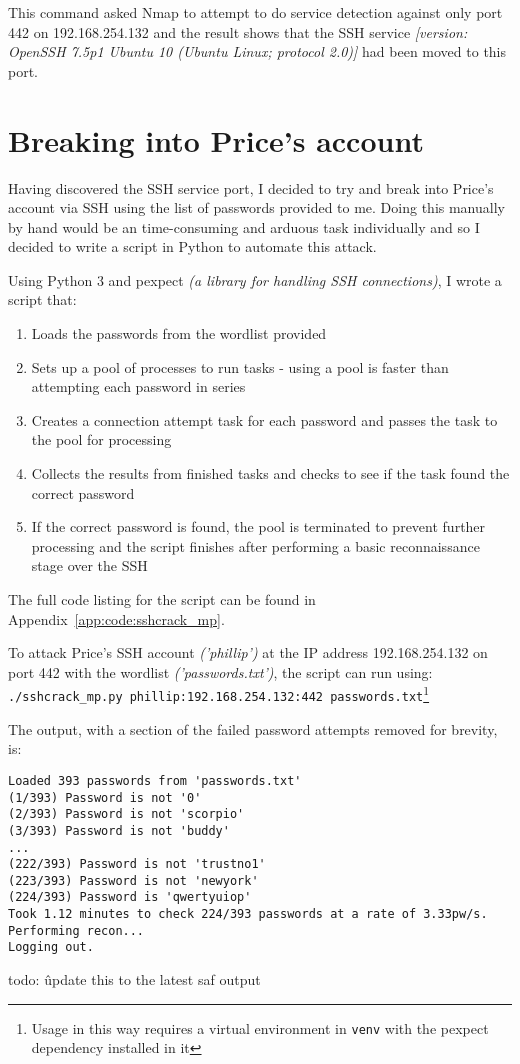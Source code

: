 \documentclass[12pt]{report}
\newcommand{\term}[1]{\colorbox{light-gray}{\texttt{#1}}}
\begin{document}
This command asked Nmap to attempt to do service detection against only port 442 on 192.168.254.132 and the result shows that the SSH service \textit{[version: OpenSSH 7.5p1 Ubuntu 10 (Ubuntu Linux; protocol 2.0)]} had been moved to this port.


\section{Breaking into Price's account}
Having discovered the SSH service port, I decided to try and break into Price's account via SSH using the list of passwords provided to me. Doing this manually by hand would be an time-consuming and arduous task individually and so I decided to write a script in Python to automate this attack.

Using Python 3 and pexpect \textit{(a library for handling SSH connections)}, I wrote a script that:
\begin{enumerate}
  \item Loads the passwords from the wordlist provided
  \item Sets up a pool of processes to run tasks - using a pool is faster than attempting each password in series
  \item Creates a connection attempt task for each password and passes the task to the pool for processing
  \item Collects the results from finished tasks and checks to see if the task found the correct password
  \item If the correct password is found, the pool is terminated to prevent further processing and the script finishes after performing a basic reconnaissance stage over the SSH
\end{enumerate}

The full code listing for the script can be found in Appendix~\ref{app:code:sshcrack_mp}.

To attack Price's SSH account \textit{('phillip')} at the IP address 192.168.254.132 on port 442 with the wordlist \textit{('passwords.txt')}, the script can run using:\\
\term{./sshcrack\_mp.py phillip:192.168.254.132:442 passwords.txt}\footnote{Usage in this way requires a virtual environment in \texttt{venv} with the pexpect dependency installed in it}

The output, with a section of the failed password attempts removed for brevity, is:
\begin{Verbatim}[frame=leftline]
Loaded 393 passwords from 'passwords.txt'
(1/393) Password is not '0'
(2/393) Password is not 'scorpio'
(3/393) Password is not 'buddy'
...
(222/393) Password is not 'trustno1'
(223/393) Password is not 'newyork'
(224/393) Password is 'qwertyuiop'
Took 1.12 minutes to check 224/393 passwords at a rate of 3.33pw/s.
Performing recon...
Logging out.
\end{Verbatim}
todo: \^update this to the latest saf output
\end{document}
